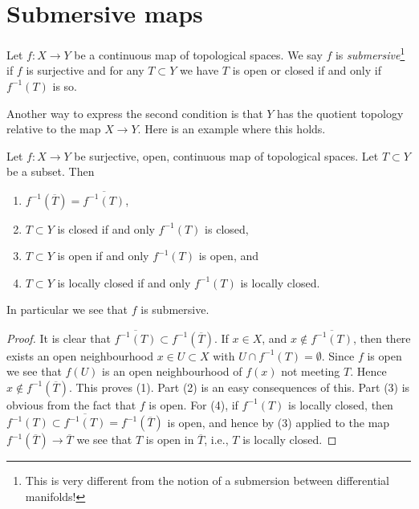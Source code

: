 \section{Submersive maps}
\label{section-submersive}


\begin{definition}
\label{definition-submersive}
Let $f : X \to Y$ be a continuous map of topological spaces.
We say $f$ is {\it submersive}\footnote{This is very different from
the notion of a submersion between differential manifolds!}
if $f$ is surjective and for any $T \subset Y$ we have $T$ is
open or closed if and only if $f^{-1}(T)$ is so.
\end{definition}

\noindent
Another way to express the second condition is that $Y$ has the
quotient topology relative to the map $X \to Y$. Here is an example
where this holds.

\begin{lemma}
\label{lemma-open-morphism-quotient-topology}
Let $f : X \to Y$ be surjective, open, continuous map of topological spaces.
Let $T \subset Y$ be a subset. Then
\begin{enumerate}
\item $f^{-1}(\overline{T}) = \overline{f^{-1}(T)}$,
\item $T \subset Y$ is closed if and only $f^{-1}(T)$ is closed,
\item $T \subset Y$ is open if and only $f^{-1}(T)$ is open, and
\item $T \subset Y$ is locally closed if and only $f^{-1}(T)$ is locally closed.
\end{enumerate}
In particular we see that $f$ is submersive.
\end{lemma}

\begin{proof}
It is clear that $\overline{f^{-1}(T)} \subset f^{-1}(\overline{T})$.
If $x \in X$, and $x \not \in \overline{f^{-1}(T)}$, then there
exists an open neighbourhood $x \in U \subset X$ with
$U \cap f^{-1}(T) = \emptyset$. Since $f$ is open we see that
$f(U)$ is an open neighbourhood of $f(x)$ not meeting $T$.
Hence $x \not \in f^{-1}(\overline{T})$. This proves (1).
Part (2) is an easy consequences of this.
Part (3) is obvious from the fact that $f$ is open.
For (4), if $f^{-1}(T)$
is locally closed, then
$f^{-1}(T) \subset \overline{f^{-1}(T)} = f^{-1}(\overline{T})$
is open, and hence by (3) applied to the map
$f^{-1}(\overline{T}) \to \overline{T}$ we see that
$T$ is open in $\overline{T}$, i.e., $T$ is locally closed.
\end{proof}







